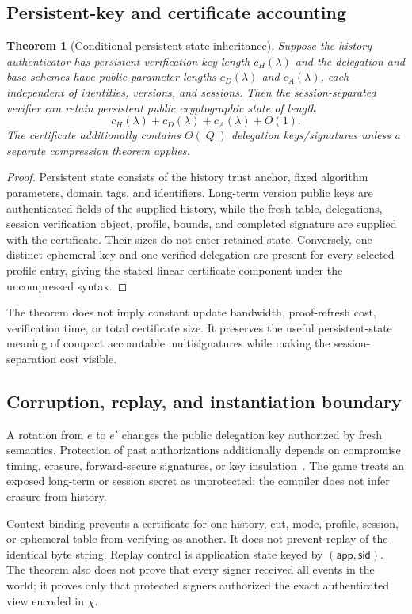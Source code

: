 \documentclass[11pt]{article}
\newtheorem{theorem}{Theorem}[section]
\theoremstyle{definition}
\begin{document}
\subsection{Persistent-key and certificate accounting}
\begin{theorem}[Conditional persistent-state inheritance]\label{thm:keysize}
Suppose the history authenticator has persistent verification-key length $c_H(\lambda)$ and the delegation and base schemes have public-parameter lengths $c_D(\lambda)$ and $c_A(\lambda)$, each independent of identities, versions, and sessions.  Then the session-separated verifier can retain persistent public cryptographic state of length
\[
 c_H(\lambda)+c_D(\lambda)+c_A(\lambda)+O(1).
\]
The certificate additionally contains $\Theta(|Q|)$ delegation keys/signatures unless a separate compression theorem applies.
\end{theorem}
\begin{proof}
Persistent state consists of the history trust anchor, fixed algorithm parameters, domain tags, and identifiers.  Long-term version public keys are authenticated fields of the supplied history, while the fresh table, delegations, session verification object, profile, bounds, and completed signature are supplied with the certificate.  Their sizes do not enter retained state.  Conversely, one distinct ephemeral key and one verified delegation are present for every selected profile entry, giving the stated linear certificate component under the uncompressed syntax.
\end{proof}
The theorem does not imply constant update bandwidth, proof-refresh cost, verification time, or total certificate size.  It preserves the useful persistent-state meaning of compact accountable multisignatures while making the session-separation cost visible.

\subsection{Corruption, replay, and instantiation boundary}
A rotation from $e$ to $e'$ changes the public delegation key authorized by fresh semantics.  Protection of past authorizations additionally depends on compromise timing, erasure, forward-secure signatures, or key insulation~\cite{bellare1999forward,itkis2001forward,dodis2002keyinsulated}.  The game treats an exposed long-term or session secret as unprotected; the compiler does not infer erasure from history.

Context binding prevents a certificate for one history, cut, mode, profile, session, or ephemeral table from verifying as another.  It does not prevent replay of the identical byte string.  Replay control is application state keyed by $(\mathsf{app},\mathsf{sid})$.  The theorem also does not prove that every signer received all events in the world; it proves only that protected signers authorized the exact authenticated view encoded in $\chi$.
\end{document}
